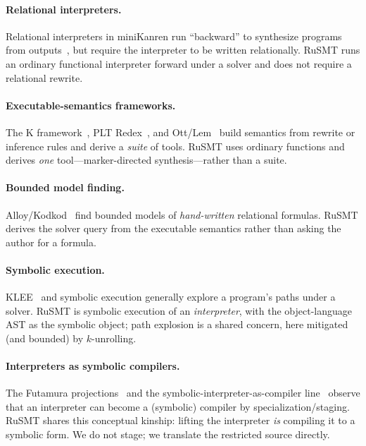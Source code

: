 \documentclass[11pt,a4paper]{article}
\theoremstyle{definition}
\theoremstyle{remark}
\newcommand{\rusmt}{RuSMT}
\begin{document}
\paragraph{Relational interpreters.}
Relational interpreters in miniKanren run ``backward'' to synthesize programs from
outputs~\cite{byrd2017unified,byrd2012quines}, but require the interpreter to be
written relationally. \rusmt{} runs an ordinary functional interpreter forward
under a solver and does not require a relational rewrite.

\paragraph{Executable-semantics frameworks.}
The K framework~\cite{rosu2010k}, PLT Redex~\cite{felleisen2009redex}, and
Ott/Lem~\cite{sewell2007ott,mulligan2014lem} build semantics from rewrite or
inference rules and derive a \emph{suite} of tools. \rusmt{} uses ordinary
functions and derives \emph{one} tool---marker-directed synthesis---rather than a
suite.

\paragraph{Bounded model finding.}
Alloy/Kodkod~\cite{jackson2002alloy,torlak2007kodkod} find bounded models of
\emph{hand-written} relational formulas. \rusmt{} derives the solver query from
the executable semantics rather than asking the author for a formula.

\paragraph{Symbolic execution.}
KLEE~\cite{cadar2008klee} and symbolic execution generally explore a program's
paths under a solver. \rusmt{} is symbolic execution of an \emph{interpreter},
with the object-language AST as the symbolic object; path explosion is a shared
concern, here mitigated (and bounded) by $k$-unrolling.

\paragraph{Interpreters as symbolic compilers.}
The Futamura projections~\cite{futamura1999partial} and the
symbolic-interpreter-as-compiler line~\cite{wei2020gensym} observe that an
interpreter can become a (symbolic) compiler by specialization/staging. \rusmt{}
shares this conceptual kinship: lifting the interpreter \emph{is} compiling it to
a symbolic form. We do not stage; we translate the restricted source directly.
\end{document}
